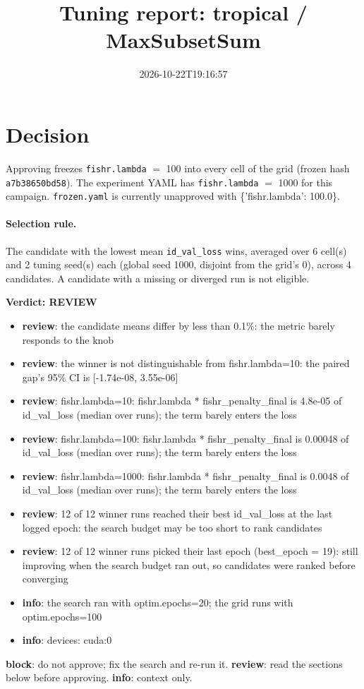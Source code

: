\documentclass[10pt]{article}
\title{Tuning report: tropical / MaxSubsetSum}
\date{2026-10-22T19:16:57}
\begin{document}
\maketitle

\section{Decision}
Approving freezes
\texttt{fishr.lambda} $=$ 100 into every cell of the grid (frozen hash \texttt{a7b38650bd58}).
The experiment YAML has
\texttt{fishr.lambda} $=$ 1000 for this campaign.
\texttt{frozen.yaml} is currently unapproved with \{'fishr.lambda': 100.0\}.

\paragraph{Selection rule.} The candidate with the lowest mean \texttt{id\_val\_loss} wins, averaged over 6 cell(s) and 2 tuning seed(s) each (global seed 1000, disjoint from the grid's 0), across 4 candidates. A candidate with a missing or diverged run is not eligible.

\begin{framed}
\noindent\textbf{Verdict: \textcolor{orange!85!black}{REVIEW}}
\begin{itemize}\setlength\itemsep{0pt}
\item \textbf{review}: the candidate means differ by less than 0.1\%: the metric barely responds to the knob
\item \textbf{review}: the winner is not distinguishable from fishr.lambda=10: the paired gap's 95\% CI is [-1.74e-08, 3.55e-06]
\item \textbf{review}: fishr.lambda=10: fishr.lambda * fishr\_penalty\_final is 4.8e-05 of id\_val\_loss (median over runs); the term barely enters the loss
\item \textbf{review}: fishr.lambda=100: fishr.lambda * fishr\_penalty\_final is 0.00048 of id\_val\_loss (median over runs); the term barely enters the loss
\item \textbf{review}: fishr.lambda=1000: fishr.lambda * fishr\_penalty\_final is 0.0048 of id\_val\_loss (median over runs); the term barely enters the loss
\item \textbf{review}: 12 of 12 winner runs reached their best id\_val\_loss at the last logged epoch: the search budget may be too short to rank candidates
\item \textbf{review}: 12 of 12 winner runs picked their last epoch (best\_epoch = 19): still improving when the search budget ran out, so candidates were ranked before converging
\item \textbf{info}: the search ran with optim.epochs=20; the grid runs with optim.epochs=100
\item \textbf{info}: devices: cuda:0
\end{itemize}
\end{framed}
\noindent\textbf{block}: do not approve; fix the search and re-run it. \textbf{review}: read the sections below before approving. \textbf{info}: context only.
\end{document}
